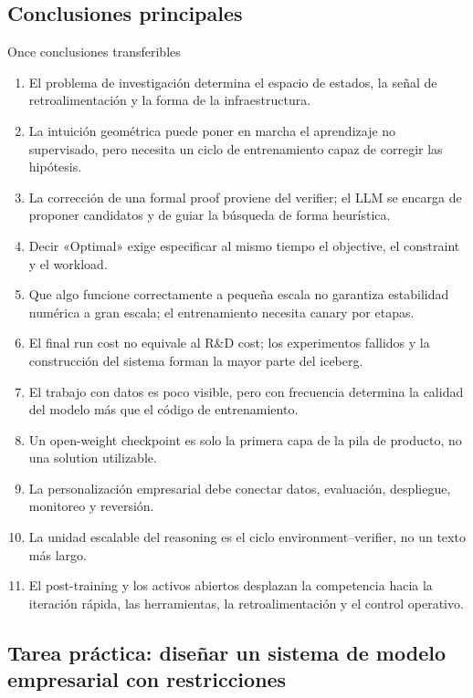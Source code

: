 \documentclass[a4paper]{article}
\begin{document}
\subsection{Conclusiones principales}

\begin{importantbox}{Once conclusiones transferibles}
\begin{enumerate}
  \item El problema de investigación determina el espacio de estados, la señal de retroalimentación y la forma de la infraestructura.
  \item La intuición geométrica puede poner en marcha el aprendizaje no supervisado, pero necesita un ciclo de entrenamiento capaz de corregir las hipótesis.
  \item La corrección de una formal proof proviene del verifier; el LLM se encarga de proponer candidatos y de guiar la búsqueda de forma heurística.
  \item Decir «Optimal» exige especificar al mismo tiempo el objective, el constraint y el workload.
  \item Que algo funcione correctamente a pequeña escala no garantiza estabilidad numérica a gran escala; el entrenamiento necesita canary por etapas.
  \item El final run cost no equivale al R\&D cost; los experimentos fallidos y la construcción del sistema forman la mayor parte del iceberg.
  \item El trabajo con datos es poco visible, pero con frecuencia determina la calidad del modelo más que el código de entrenamiento.
  \item Un open-weight checkpoint es solo la primera capa de la pila de producto, no una solution utilizable.
  \item La personalización empresarial debe conectar datos, evaluación, despliegue, monitoreo y reversión.
  \item La unidad escalable del reasoning es el ciclo environment--verifier, no un texto más largo.
  \item El post-training y los activos abiertos desplazan la competencia hacia la iteración rápida, las herramientas, la retroalimentación y el control operativo.
\end{enumerate}
\end{importantbox}

\subsection{Tarea práctica: diseñar un sistema de modelo empresarial con restricciones}
\end{document}
